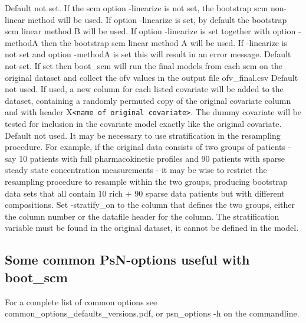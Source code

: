 \begin{optionlist}
Default not set. If the scm option -linearize is not set, the bootstrap scm non-linear method will be used. If option -linearize is set, by default the bootstrap scm linear method B will be used. If option -linearize is set  together with option -methodA then the bootstrap scm linear method A will be used. If -linearize is not set and option -methodA is set this will result in an error message.  
\nextopt
{}
Default not set. If set then boot\_scm will run the final models from each scm on the original dataset and collect the ofv values in the output file ofv\_final.csv   
\nextopt
{}
Default not used. If used, a new column for each listed covariate will be added to the dataset, containing a randomly permuted copy of the original covariate column and with header X\verb|<name of original covariate>|. The dummy covariate will be tested for inclusion in the covariate model exactly like the original covariate. 
\nextopt
{}
Default not used. It may be necessary to use stratification in the resampling procedure. For example, if the original data consists of two groups of patients - say 10 patients with full pharmacokinetic profiles and 90 patients with sparse steady state concentration measurements - it may be wise to restrict the resampling procedure to resample within the two groups, producing bootstrap data sets that all contain 10 rich + 90 sparse data patients but with different compositions. Set -stratify\_on to the column that defines the two groups, either the column number or the datafile header for the column. The stratification variable must be found in the original dataset, it cannot be defined in the model. 
\nextopt
\end{optionlist}


\subsection{Some common PsN-options useful with boot\_scm}

For a complete list of common options see common\_options\_defaults\_versions.pdf, or psn\_options -h on the commandline.

